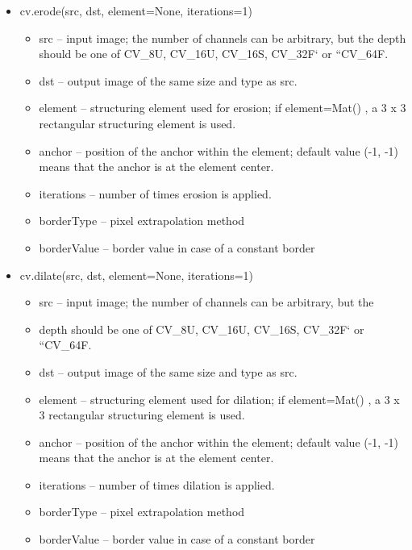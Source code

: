 \documentclass[11pt]{ctexart}
\begin{document}
\begin{itemize}
    \item cv.erode(src, dst, element=None, iterations=1) 
    \begin{itemize}
        \item src – input image; the number of channels can be arbitrary, but the depth should be one of CV\_8U, CV\_16U, CV\_16S, CV\_32F` or ``CV\_64F.
        \item dst – output image of the same size and type as src.
        \item element – structuring element used for erosion; if element=Mat() , a 3 x 3 rectangular structuring element is used.
        \item anchor – position of the anchor within the element; default value (-1, -1) means that the anchor is at the element center.
        \item iterations – number of times erosion is applied.
        \item borderType – pixel extrapolation method
        \item borderValue – border value in case of a constant border
    \end{itemize}
\end{itemize}
    
    
\begin{itemize}
    \item cv.dilate(src, dst, element=None, iterations=1)
     \begin{itemize}
    \item src – input image; the number of channels can be arbitrary, but the \item depth should be one of CV\_8U, CV\_16U, CV\_16S, CV\_32F` or ``CV\_64F.
    \item dst – output image of the same size and type as src.
    \item element – structuring element used for dilation; if element=Mat() , a 3 x 3 rectangular structuring element is used.
    \item anchor – position of the anchor within the element; default value (-1, -1) means that the anchor is at the element center.
    \item iterations – number of times dilation is applied.
    \item borderType – pixel extrapolation method
    \item borderValue – border value in case of a constant border
    \end{itemize}
\end{itemize}
   
\end{document}
